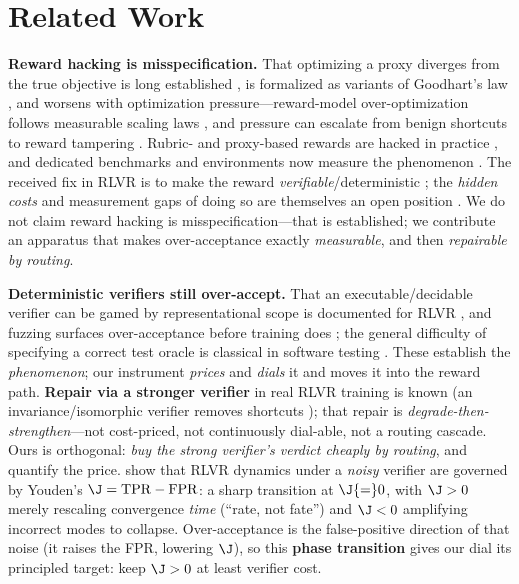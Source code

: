 \section{Related Work}
\textbf{Reward hacking is misspecification.} That optimizing a proxy diverges from the true objective is long
established \citep{amodei2016concrete,krakovna2020specification,skalse2022reward,pan2022misspecification}, is
formalized as variants of Goodhart's law \citep{manheim2018goodhart,karwowski2024goodhart}, and worsens with
optimization pressure---reward-model over-optimization follows measurable scaling laws
\citep{gao2023overoptimization}, and pressure can escalate from benign shortcuts to reward tampering
\citep{denison2024subterfuge}. Rubric- and proxy-based rewards are hacked in practice
\citep{rubricrewardhacking,correlatedproxies}, and dedicated benchmarks and environments now measure the
phenomenon \citep{rewardhackbench,hackverifiable}. The received fix in RLVR is to make the reward
\emph{verifiable}/deterministic \citep{verificationhorizon,lambert2024tulu3}; the \emph{hidden costs} and
measurement gaps of doing so are themselves an open position \citep{hiddencosts}. We do not claim reward
hacking is misspecification---that is established; we contribute an apparatus that makes over-acceptance
exactly \emph{measurable}, and then \emph{repairable by routing}.

\textbf{Deterministic verifiers still over-accept.} That an executable/decidable verifier can be gamed by
representational scope is documented for RLVR \citep{gamingverifiers}, and fuzzing surfaces over-acceptance
before training does \citep{fuzzverifiers}; the general difficulty of specifying a correct test oracle is
classical in software testing \citep{barr2015oracle}. These establish the \emph{phenomenon}; our instrument
\emph{prices} and \emph{dials} it and moves it into the reward path. \textbf{Repair via a stronger verifier}
in real RLVR training is known (an invariance/isomorphic verifier removes shortcuts \citep{gamingverifiers});
that repair is \emph{degrade-then-strengthen}---not cost-priced, not continuously dial-able, not a routing
cascade. Ours is orthogonal: \emph{buy the strong verifier's verdict cheaply by routing}, and quantify the
price. \citet{rateorfate2026} show that RLVR dynamics under a \emph{noisy} verifier are governed by Youden's
$\J=\mathrm{TPR}-\mathrm{FPR}$: a sharp transition at $\J{=}0$, with $\J>0$ merely rescaling convergence
\emph{time} (``rate, not fate'') and $\J<0$ amplifying incorrect modes to collapse. Over-acceptance is the
false-positive direction of that noise (it raises the FPR, lowering $\J$), so this \textbf{phase transition}
gives our dial its principled target: keep $\J>0$ at least verifier cost.

